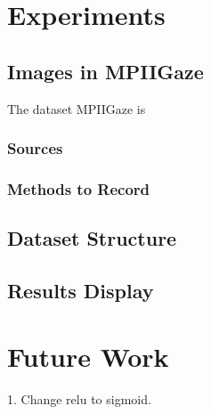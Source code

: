 \documentclass[senior]{IPSstyle}
\begin{document}


\chapter{Experiments} \label{experiments}
\section{Images in MPIIGaze}\label{sec: dataset}
The dataset MPIIGaze is 
\subsection{Sources}
\subsection{Methods to Record}
\section{Dataset Structure}
\section{Results Display}

\chapter{Future Work}\label{future work}
1. Change relu to sigmoid.


\end{document}
